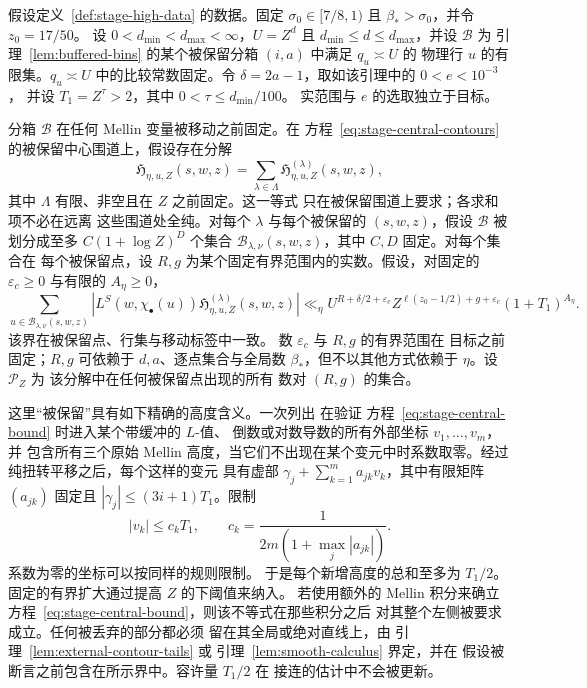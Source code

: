 \begin{lemma}[一个被保留积分及其指数]
\label{lem:bin-contour-accounting}
假设定义~\ref{def:stage-high-data} 的数据。固定
$\sigma_0\in[7/8,1)$ 且 $\beta_*>\sigma_0$，并令 $z_0=17/50$。
设 $0<d_{\min}<d_{\max}<\infty$，$U=Z^d$ 且
$d_{\min}\le d\le d_{\max}$，并设 $\mathcal B$ 为
引理~\ref{lem:buffered-bins} 的某个被保留分箱 $(i,a)$ 中满足 $q_u\asymp U$ 的
物理行 $u$ 的有限集。$q_u\asymp U$
中的比较常数固定。令 $\delta=2a-1$，取如该引理中的 $0<e<10^{-3}$，
并设 $T_1=Z^\tau>2$，其中 $0<\tau\le d_{\min}/100$。
实范围与 $e$ 的选取独立于目标。

分箱 $\mathcal B$ 在任何 Mellin 变量被移动之前固定。在
方程~\eqref{eq:stage-central-contours} 的被保留中心围道上，假设存在分解
\[
 \mathfrak H_{\eta,u,Z}(s,w,z)
       =\sum_{\lambda\in\Lambda}
             \mathfrak H^{(\lambda)}_{\eta,u,Z}(s,w,z),
\]
其中 $\Lambda$ 有限、非空且在 $Z$ 之前固定。这一等式
只在被保留围道上要求；各求和项不必在远离
这些围道处全纯。对每个 $\lambda$ 与每个被保留的 $(s,w,z)$，假设
$\mathcal B$ 被划分成至多 $C(1+\log Z)^D$ 个集合
$\mathcal B_{\lambda,\nu}(s,w,z)$，其中 $C,D$ 固定。对每个集合在
每个被保留点，设 $R,g$ 为某个固定有界范围内的实数。假设，对固定的
$\varepsilon_c\ge0$ 与有限的 $A_\eta\ge0$，
\begin{equation}
 \sum_{u\in\mathcal B_{\lambda,\nu}(s,w,z)}
  \left|L^S(w,\chi_\bullet(u))
       \mathfrak H^{(\lambda)}_{\eta,u,Z}(s,w,z)\right|
 \ll_\eta U^{R+\delta/2+\varepsilon_c}
 Z^{\ell(z_0-1/2)+g+\varepsilon_c}(1+T_1)^{A_\eta}.
 \label{eq:stage-central-bound}
\end{equation}
该界在被保留点、行集与移动标签中一致。
数 $\varepsilon_c$ 与 $R,g$ 的有界范围在
目标之前固定；$R,g$ 可依赖于 $d,a$、逐点集合与全局数
$\beta_*$，但不以其他方式依赖于 $\eta$。设 $\mathcal P_Z$ 为
该分解中在任何被保留点出现的所有
数对 $(R,g)$ 的集合。

这里“被保留”具有如下精确的高度含义。一次列出
在验证
方程~\eqref{eq:stage-central-bound} 时进入某个带缓冲的 $L$-值、
倒数或对数导数的所有外部坐标 $v_1,\ldots,v_m$，并
包含所有三个原始
Mellin 高度，当它们不出现在某个变元中时系数取零。经过
纯扭转平移之后，每个这样的变元
具有虚部
$\gamma_j+\sum_{k=1}^m a_{jk}v_k$，其中有限矩阵 $(a_{jk})$
固定且 $|\gamma_j|\le(3i+1)T_1$。限制
\begin{equation}
 |v_k|\le c_kT_1,\qquad
 c_k=\frac1{2m(1+\max_j|a_{jk}|)}.
 \label{eq:stage-height-allocation}
\end{equation}
系数为零的坐标可以按同样的规则限制。
于是每个新增高度的总和至多为 $T_1/2$。
固定的有界扩大通过提高 $Z$ 的下阈值来纳入。
若使用额外的 Mellin 积分来确立
方程~\eqref{eq:stage-central-bound}，则该不等式在那些积分之后
对其整个左侧被要求成立。任何被丢弃的部分都必须
留在其全局或绝对直线上，由
引理~\ref{lem:external-contour-tails} 或
引理~\ref{lem:smooth-calculus} 界定，并在
假设被断言之前包含在所示界中。容许量 $T_1/2$ 在
接连的估计中不会被更新。


\end{lemma}
